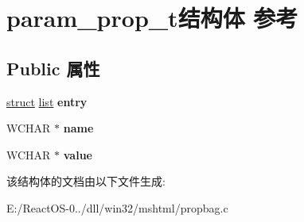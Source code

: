 \hypertarget{structparam__prop__t}{}\section{param\+\_\+prop\+\_\+t结构体 参考}
\label{structparam__prop__t}
\subsection*{Public 属性}
\begin{DoxyCompactItemize}
\item 
\mbox{\label{structparam__prop__t_a2a9196384f60ade7130d22702c3be430}} 
\hyperlink{interfacestruct}{struct} \hyperlink{classlist}{list} {\bfseries entry}
\item 
\mbox{\label{structparam__prop__t_aa70d7881297d29b06217f8fe0761a262}} 
W\+C\+H\+AR $\ast$ {\bfseries name}
\item 
\mbox{\label{structparam__prop__t_aa2350017d1e0c44708a40cb519eafa24}} 
W\+C\+H\+AR $\ast$ {\bfseries value}
\end{DoxyCompactItemize}


该结构体的文档由以下文件生成\+:\begin{DoxyCompactItemize}
\item 
E\+:/\+React\+O\+S-\/0../dll/win32/mshtml/propbag.\+c\end{DoxyCompactItemize}
